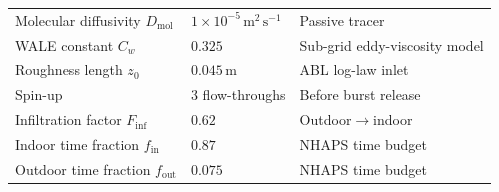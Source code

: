 \begin{table}[htbp]
\begin{tabular}{@{}lll@{}}
Molecular diffusivity $D_\mathrm{mol}$ & $1\times10^{-5}\,\mathrm{m^2\,s^{-1}}$  & Passive tracer \\
WALE constant $C_w$                    & $0.325$                                 & Sub-grid eddy-viscosity model \\
Roughness length $z_0$                 & $0.045\,\mathrm{m}$                     & ABL log-law inlet \\
Spin-up                                & 3 flow-throughs                         & Before burst release \\
Infiltration factor $F_\mathrm{inf}$   & $0.62$                                  & Outdoor$\rightarrow$indoor \\
Indoor time fraction $f_\mathrm{in}$   & $0.87$                                  & NHAPS time budget \\
Outdoor time fraction $f_\mathrm{out}$ & $0.075$                                 & NHAPS time budget \\
\bottomrule
\end{tabular}
\end{table}
